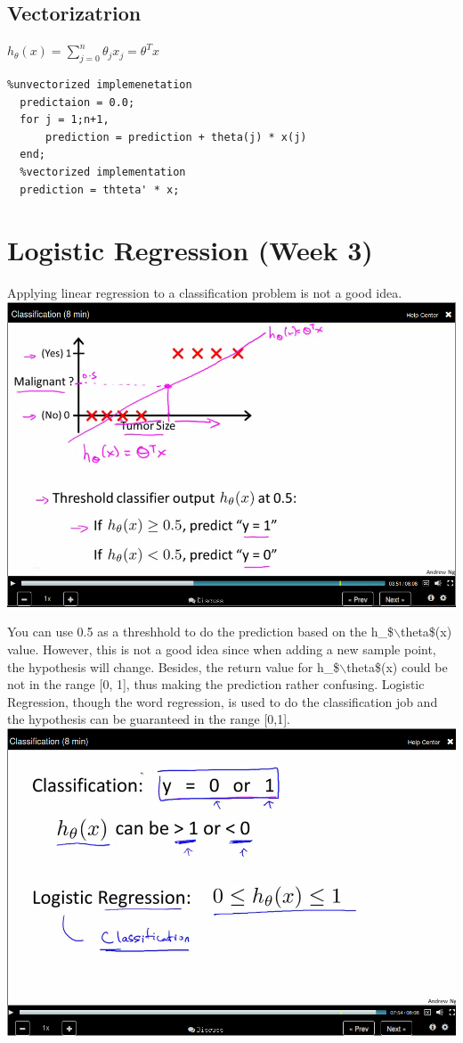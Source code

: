 \documentclass[11pt]{article}
\begin{document}
\subsection*{Vectorizatrion}
\label{sec-6-6}

$h_\theta(x) = \sum_{j=0}^{n} \theta_j x_j = \theta^T x$
\begin{verbatim}
%unvectorized implemenetation
  predictaion = 0.0;
  for j = 1;n+1,
      prediction = prediction + theta(j) * x(j)
  end;
  %vectorized implementation
  prediction = thteta' * x;
\end{verbatim}

\section*{Logistic Regression (Week 3)}
\label{sec-7}
Applying linear regression to a classification problem is not a good idea.
\includegraphics[width=.9\linewidth]{./images/screenshot-23.png}

You can use 0.5 as a threshhold to do the prediction based on the h\_\$$\backslash$theta\$(x)
value. However, this is not a good idea since when adding a new sample point,
the hypothesis will change. Besides, the return value for h\_\$$\backslash$theta\$(x) could be
not in the range [0, 1], thus making the prediction rather confusing. Logistic
Regression, though the word regression, is used to do the classification job and
the hypothesis can be guaranteed in the range [0,1].
\includegraphics[width=.9\linewidth]{./images/screenshot-24.png}
\end{document}
